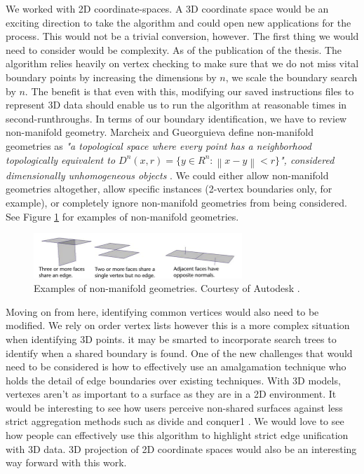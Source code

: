 We worked with 2D coordinate-spaces. A 3D coordinate space would be an exciting direction to take the algorithm and could open new applications for the process. This would not be a trivial conversion, however. The first thing we would need to consider would be complexity. As of the publication of the thesis. The algorithm relies heavily on vertex checking to make sure that we do not miss vital boundary points by increasing the dimensions by $n$, we scale the boundary search by $n$. The benefit is that even with this, modifying our saved instructions files to represent 3D data should enable us to run the algorithm at reasonable times in second-runthroughs. In terms of our boundary identification, we have to review non-manifold geometry. Marcheix and Gueorguieva define non-manifold geometries as \textit{"a topological space where every point has a neighborhood topologically equivalent to $D^n(x,r) = \{ y \in R^n : \left \| x-y \right \| < r \}$", considered dimensionally unhomogeneous objects} \cite{marcheix1995topological}. We could either allow non-manifold geometries altogether, allow specific instances (2-vertex boundaries only, for example), or completely ignore non-manifold geometries from being considered. See Figure \ref{fig:manifold} for examples of non-manifold geometries.
\begin{figure}[t]
\includegraphics[width=0.7\textwidth]{images/ch7/nonmanifold}
\caption{Examples of non-manifold geometries. Courtesy of Autodesk \cite{autodesk_2019}.} \label{fig:manifold}
\end{figure}
Moving on from here, identifying common vertices would also need to be modified. We rely on order vertex lists however this is a more complex situation when identifying 3D points. it may be smarted to incorporate search trees to identify when a shared boundary is found. One of the new challenges that would need to be considered is how to effectively use an amalgamation technique who holds the detail of edge boundaries over existing techniques. With 3D models, vertexes aren't as important to a surface as they are in a 2D environment. It would be interesting to see how users perceive non-shared surfaces against less strict aggregation methods such as divide and conquer1 \cite{boissonnat1998algorithmic}. We would love to see how people can effectively use this algorithm to highlight strict edge unification with 3D data. 3D projection of 2D coordinate spaces would also be an interesting way forward with this work.

